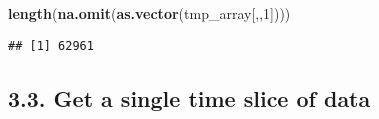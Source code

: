 \documentclass[]{article}
\newenvironment{Shaded}{\begin{snugshade}}{\end{snugshade}}
\newcommand{\KeywordTok}[1]{\textcolor[rgb]{0.13,0.29,0.53}{\textbf{#1}}}
\newcommand{\DecValTok}[1]{\textcolor[rgb]{0.00,0.00,0.81}{#1}}
\newcommand{\StringTok}[1]{\textcolor[rgb]{0.31,0.60,0.02}{#1}}
\newcommand{\CommentTok}[1]{\textcolor[rgb]{0.56,0.35,0.01}{\textit{#1}}}
\newcommand{\OtherTok}[1]{\textcolor[rgb]{0.56,0.35,0.01}{#1}}
\newcommand{\OperatorTok}[1]{\textcolor[rgb]{0.81,0.36,0.00}{\textbf{#1}}}
\newcommand{\NormalTok}[1]{#1}
\begin{document}
\begin{Shaded}
\end{Shaded}

\begin{Shaded}
\begin{Highlighting}[]
\KeywordTok{length}\NormalTok{(}\KeywordTok{na.omit}\NormalTok{(}\KeywordTok{as.vector}\NormalTok{(tmp_array[,,}\DecValTok{1}\NormalTok{])))}
\end{Highlighting}
\end{Shaded}

\begin{verbatim}
## [1] 62961
\end{verbatim}

\subsection{3.3. Get a single time slice of
data}\label{get-a-single-time-slice-of-data}
\end{document}
